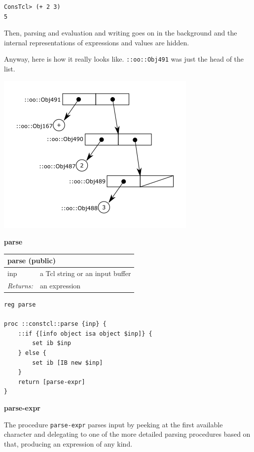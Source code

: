 \documentclass[twoside,9pt]{report}
\begin{document}
\noindent\makebox[\linewidth]{\rule{\linewidth}{0.4pt}}
\begin{lstlisting}
ConsTcl> (+ 2 3)
5
\end{lstlisting}
\noindent\makebox[\linewidth]{\rule{\linewidth}{0.4pt}}

Then, parsing and evaluation and writing goes on in the background and the internal representations of expressions and values are hidden.


Anyway, here is how it really looks like. \texttt{::oo::Obj491} was just the head of the list.


\includegraphics{images/intreplist.png}


\textbf{parse}

\begin{tabular}{ |l l| }
\hline
\multicolumn{2}{|l|}{parse (public)} \\
\hline
inp & a Tcl string or an input buffer \\
\textit{Returns:} & an expression \\
\hline
\end{tabular}

\noindent\makebox[\linewidth]{\rule{\linewidth}{0.4pt}}
\begin{lstlisting}
reg parse
 
proc ::constcl::parse {inp} {
    ::if {[info object isa object $inp]} {
        set ib $inp
    } else {
        set ib [IB new $inp]
    }
    return [parse-expr]
}
\end{lstlisting}
\noindent\makebox[\linewidth]{\rule{\linewidth}{0.4pt}}

\textbf{parse-expr}


The procedure \texttt{parse-expr} parses input by peeking at the first available character and delegating to one of the more detailed parsing procedures based on that, producing an expression of any kind.
\end{document}
